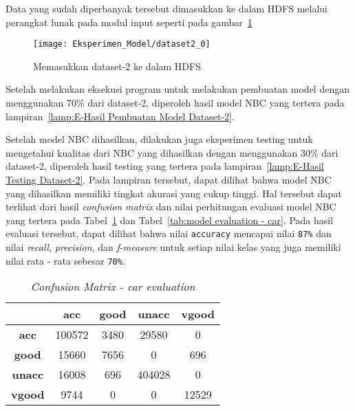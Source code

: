 Data yang sudah diperbanyak tersebut dimasukkan ke dalam HDFS melalui perangkat lunak pada modul input seperti pada gambar~\ref{fig:Memasukkan dataset-2 ke dalam HDFS}

\begin{figure}[H]
	\centering
	\texttt{[image: Eksperimen\_Model/dataset2\_0]}
	\caption[Memasukkan dataset-2 ke dalam HDFS]{Memasukkan dataset-2 ke dalam HDFS}
	\label{fig:Memasukkan dataset-2 ke dalam HDFS}
\end{figure}

Setelah melakukan eksekusi program untuk melakukan pembuatan model dengan menggunakan 70\% dari dataset-2, diperoleh hasil model NBC yang tertera pada lampiran~\ref{lamp:E-Hasil Pembuatan Model Dataset-2}.

Setelah model NBC dihasilkan, dilakukan juga eksperimen testing untuk mengetahui kualitas dari NBC yang dihasilkan dengan menggunakan 30\% dari dataset-2, diperoleh hasil testing yang tertera pada lampiran~\ref{lamp:E-Hasil Testing Dataset-2}. Pada lampiran tersebut, dapat dilihat bahwa model NBC yang dihasilkan memiliki tingkat akurasi yang cukup tinggi. Hal tersebut dapat terlihat dari hasil \textit{confusion matrix} dan nilai perhitungan evaluasi model NBC yang tertera pada Tabel~\ref{tab:confusion matrix - car} dan Tabel~\ref{tab:model evaluation - car}. Pada hasil evaluasi tersebut, dapat dilihat bahwa nilai \texttt{accuracy} mencapai nilai \texttt{87\%} dan nilai \textit{recall}, \textit{precision}, dan \textit{f-measure} untuk setiap nilai kelas yang juga memiliki nilai rata - rata sebesar \texttt{70\%}.

\begin{table}[H]
\label{tab:confusion matrix - car}
\centering
\caption{\textit{Confusion Matrix - car evaluation}}
\begin{tabular}{ | c | c | c | c | c | }
\hline
& \textbf{acc} & \textbf{good} & \textbf{unacc} & \textbf{vgood} \\ \hline \hline
\textbf{acc} & 100572 & 3480 & 29580 & 0 \\ \hline
\textbf{good} & 15660 & 7656 & 0 & 696 \\ \hline
\textbf{unacc} & 16008 & 696 & 404028 & 0 \\ \hline
\textbf{vgood} & 9744 & 0 & 0 & 12529 \\ \hline
\end{tabular}
\end{table}

